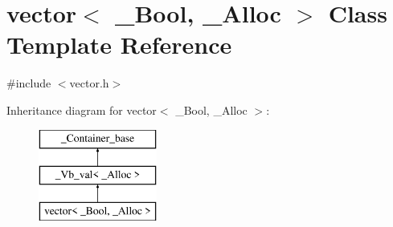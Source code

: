 \hypertarget{classvector_3_01___bool_00_01___alloc_01_4}{\section{vector$<$ \+\_\+\+Bool, \+\_\+\+Alloc $>$ Class Template Reference}
\label{classvector_3_01___bool_00_01___alloc_01_4}
}


{\ttfamily \#include $<$vector.\+h$>$}

Inheritance diagram for vector$<$ \+\_\+\+Bool, \+\_\+\+Alloc $>$\+:\begin{figure}[H]
\begin{center}
\leavevmode
\includegraphics[height=3.000000cm]{classvector_3_01___bool_00_01___alloc_01_4}
\end{center}
\end{figure}

